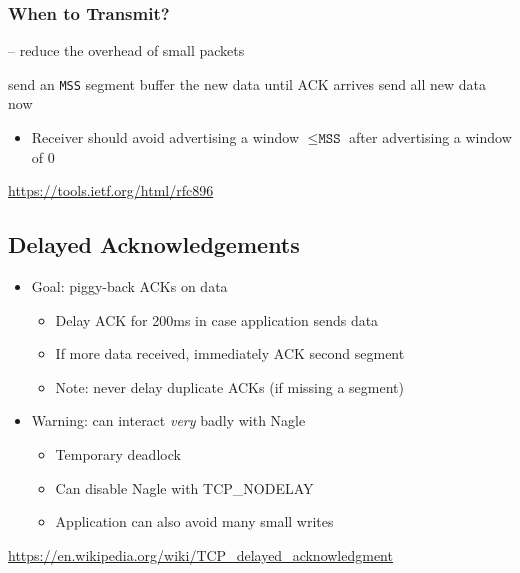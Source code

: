 \subsubsection{When to Transmit?}
\begin{algorithm}[H]
    \caption[Nagle's Algorithm]{ -- reduce the overhead of small packets}
    \label{alg:nagle}
    \begin{algorithmic}[1]
        \State send an \texttt{MSS} segment
        \Else
        \State buffer the new data until ACK arrives
        \Else
        \State send all new data now
        \EndIf
        \EndIf
    \end{algorithmic}
\end{algorithm}
\begin{itemize}
    \item Receiver should avoid advertising a window $\leq\texttt{MSS}$ after advertising a window of 0
\end{itemize}
\url{https://tools.ietf.org/html/rfc896}

\subsection{Delayed Acknowledgements}
\begin{itemize}
    \item Goal: piggy-back ACKs on data
          \begin{itemize}
              \item Delay ACK for 200ms in case application sends data
              \item If more data received, immediately ACK second segment
              \item Note: never delay duplicate ACKs (if missing a segment)
          \end{itemize}
    \item Warning: can interact \emph{very} badly with Nagle
          \begin{itemize}
              \item Temporary deadlock
              \item Can disable Nagle with TCP\_NODELAY
              \item Application can also avoid many small writes
          \end{itemize}
\end{itemize}
\url{https://en.wikipedia.org/wiki/TCP_delayed_acknowledgment}

